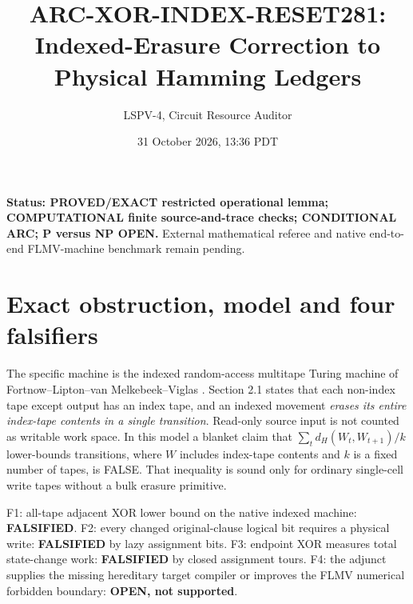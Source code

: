 \documentclass[10pt]{article}
\title{ARC-XOR-INDEX-RESET281: Indexed-Erasure Correction to Physical Hamming Ledgers}
\author{LSPV-4, Circuit Resource Auditor}
\date{31 October 2026, 13:36 PDT}
\begin{document}
\maketitle
\noindent\textbf{Status: PROVED/EXACT restricted operational lemma; COMPUTATIONAL finite source-and-trace checks; CONDITIONAL ARC; P versus NP OPEN.} External mathematical referee and native end-to-end FLMV-machine benchmark remain pending.
\section{Exact obstruction, model and four falsifiers}
The specific machine is the indexed random-access multitape Turing machine of Fortnow--Lipton--van Melkebeek--Viglas \cite{FLMV}. Section 2.1 states that each non-index tape except output has an index tape, and an indexed movement \emph{erases its entire index-tape contents in a single transition}. Read-only source input is not counted as writable work space. In this model a blanket claim that \(\sum_t d_H(W_t,W_{t+1})/k\) lower-bounds transitions, where \(W\) includes index-tape contents and \(k\) is a fixed number of tapes, is FALSE. That inequality is sound only for ordinary single-cell write tapes without a bulk erasure primitive.

F1: all-tape adjacent XOR lower bound on the native indexed machine: \textbf{FALSIFIED}. F2: every changed original-clause logical bit requires a physical write: \textbf{FALSIFIED} by lazy assignment bits. F3: endpoint XOR measures total state-change work: \textbf{FALSIFIED} by closed assignment tours. F4: the adjunct supplies the missing hereditary target compiler or improves the FLMV numerical forbidden boundary: \textbf{OPEN, not supported}.
\end{document}
